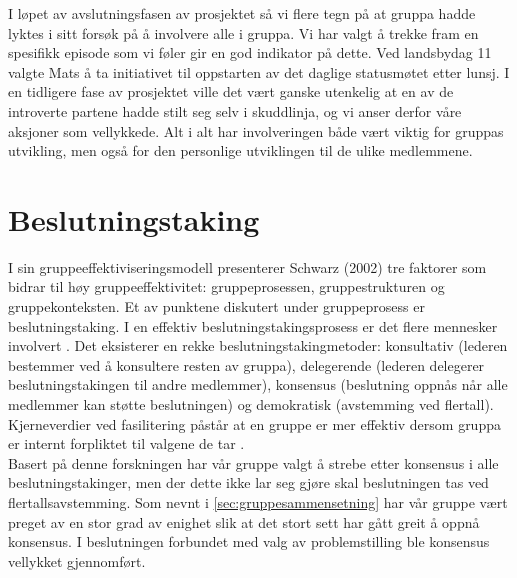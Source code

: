 I løpet av avslutningsfasen av prosjektet så vi flere tegn på at gruppa hadde lyktes i sitt forsøk på å involvere alle i gruppa. Vi har valgt å trekke fram en spesifikk episode som vi føler gir en god indikator på dette. Ved landsbydag 11 valgte Mats å ta initiativet til oppstarten av det daglige statusmøtet etter lunsj. I en tidligere fase av prosjektet ville det vært ganske utenkelig at en av de introverte partene hadde stilt seg selv i skuddlinja, og vi anser derfor våre aksjoner som vellykkede. Alt i alt har involveringen både vært viktig for gruppas utvikling, men også for den personlige utviklingen til de ulike medlemmene.\\


\section{Beslutningstaking}
\label{sec:beslutningstaking}
I sin gruppeeffektiviseringsmodell presenterer Schwarz (2002)\cite{fasilitator} tre faktorer som bidrar til høy gruppeeffektivitet: gruppeprosessen, gruppestrukturen og gruppekonteksten. Et av punktene diskutert under gruppeprosess er beslutningstaking. I en effektiv beslutningstakingsprosess er det flere mennesker involvert . Det eksisterer en rekke beslutningstakingmetoder: konsultativ (lederen bestemmer  ved å konsultere resten av gruppa), delegerende (lederen delegerer beslutningstakingen til andre medlemmer), konsensus (beslutning oppnås når alle medlemmer kan støtte beslutningen) og demokratisk (avstemming ved flertall). Kjerneverdier ved fasilitering påstår at en gruppe er mer effektiv dersom gruppa er internt forpliktet til valgene de tar \cite{fasilitator}.\\

Basert på denne forskningen har vår gruppe valgt å strebe etter konsensus i alle beslutningstakinger, men der dette ikke lar seg gjøre skal beslutningen tas ved flertallsavstemming. Som nevnt i \ref{sec:gruppesammensetning} har vår gruppe vært preget av en stor grad av enighet slik at det stort sett har gått greit å oppnå konsensus. I beslutningen forbundet med valg av problemstilling ble konsensus vellykket gjennomført.\\


